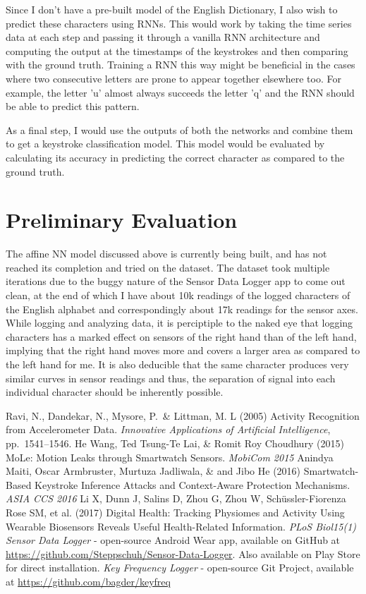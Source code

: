 \documentclass[10pt,twocolumn,letterpaper]{article}
\begin{document}
Since I don't have a pre-built model of the English Dictionary, I also wish to predict these characters using RNNs. This would work by taking the time series data at each step and passing it through a vanilla RNN architecture and computing the output at the timestamps of the keystrokes and then comparing with the ground truth. Training a RNN this way might be beneficial in the cases where two consecutive letters are prone to appear together elsewhere too. For example, the letter 'u' almost always succeeds the letter 'q' and the RNN should be able to predict this pattern.

As a final step, I would use the outputs of both the networks and combine them to get a keystroke classification model. This model would be evaluated by calculating its accuracy in predicting the correct character as compared to the ground truth.

\section{Preliminary Evaluation}
The affine NN model discussed above is currently being built, and has not reached its completion and tried on the dataset. The dataset took multiple iterations due to the buggy nature of the Sensor Data Logger app \cite{app} to come out clean, at the end of which I have about 10k readings of the logged characters of the English alphabet and correspondingly about 17k readings for the sensor axes. While logging and analyzing data, it is perciptiple to the naked eye that logging characters has a marked effect on sensors of the right hand than of the left hand, implying that the right hand moves more and covers a larger area as compared to the left hand for me. It is also deducible that the same character produces very similar curves in sensor readings and thus, the separation of signal into each individual character should be inherently possible.

\begin{thebibliography}{1}
  \small
   Ravi, N., Dandekar, N., Mysore, P.\ \& Littman, M. L (2005) Activity Recognition from Accelerometer Data. {\it Innovative Applications of Artificial Intelligence}, pp.\ 1541--1546.
  \vspace{-0.2cm}
   He Wang, Ted Tsung-Te Lai, \& Romit Roy Choudhury (2015) MoLe: Motion Leaks through Smartwatch Sensors. {\it MobiCom 2015}
   Anindya Maiti, Oscar Armbruster, Murtuza Jadliwala, \& and Jibo He (2016) Smartwatch-Based Keystroke Inference Attacks and
Context-Aware Protection Mechanisms. {\it ASIA CCS 2016}
   Li X, Dunn J, Salins D, Zhou G, Zhou W, Schüssler-Fiorenza Rose SM, et al. (2017) Digital Health: Tracking Physiomes and Activity Using Wearable Biosensors Reveals Useful Health-Related Information. {\it PLoS Biol15(1)}
   {\it Sensor Data Logger} - open-source Android Wear app, available on GitHub at \url{https://github.com/Steppschuh/Sensor-Data-Logger}. Also available on Play Store for direct installation.
   {\it Key Frequency Logger} - open-source Git Project, available at \url{https://github.com/bagder/keyfreq}
\end{thebibliography}
\end{document}
